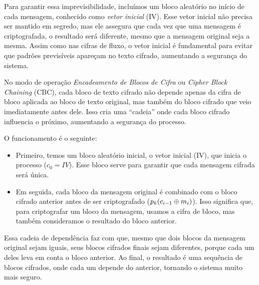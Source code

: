 Para garantir essa imprevisibilidade, incluímos um bloco aleatório no início de cada mensagem, conhecido como {\em vetor inicial} (IV).
Esse vetor inicial não precisa ser mantido em segredo, mas ele assegura que cada vez que uma mensagem é criptografada, o resultado será diferente, mesmo que a mensagem original seja a mesma.
Assim como nas cifras de fluxo, o vetor inicial é fundamental para evitar que padrões previsíveis apareçam no texto cifrado, aumentando a segurança do sistema.

No modo de operação {\em Encadeamento de Blocos de Cifra} ou {\em Cipher Block Chaining} (CBC), cada bloco de texto cifrado não depende apenas da cifra de bloco aplicada ao bloco de texto original, mas também do bloco cifrado que veio imediatamente antes dele.
Isso cria uma ``cadeia'' onde cada bloco cifrado influencia o próximo, aumentando a segurança do processo.

O funcionamento é o seguinte:

\begin{itemize}
\item Primeiro, temos um bloco aleatório inicial, o vetor inicial (IV), que inicia o processo ($c_0 = IV$).
  Esse bloco serve para garantir que cada mensagem cifrada será única.
\item Em seguida, cada bloco da mensagem original é combinado com o bloco cifrado anterior antes de ser criptografado ($p_k(c_{i-1} \oplus m_i)$).
  Isso significa que, para criptografar um bloco da mensagem, usamos a cifra de bloco, mas também consideramos o resultado do bloco anterior.
\end{itemize}

Essa cadeia de dependência faz com que, mesmo que dois blocos da mensagem original sejam iguais, seus blocos cifrados finais sejam diferentes, porque cada um deles leva em conta o bloco anterior.
Ao final, o resultado é uma sequência de blocos cifrados, onde cada um depende do anterior, tornando o sistema muito mais seguro.

\begin{center}
\end{center}

